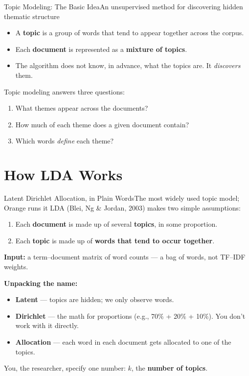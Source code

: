 \documentclass[aspectratio=169,10pt]{beamer}
\begin{document}
\begin{frame}{Topic Modeling: The Basic Idea}{An unsupervised method for discovering hidden thematic structure}
  \begin{itemize}
    \item A \textbf{topic} is a group of words that tend to appear together across the corpus.
    \item Each \textbf{document} is represented as a \textbf{mixture of topics}.
    \item The algorithm does not know, in advance, what the topics are. It \emph{discovers} them.
  \end{itemize}

  \vspace{0.6em}
  Topic modeling answers three questions:
  \begin{enumerate}
    \item What themes appear across the documents?
    \item How much of each theme does a given document contain?
    \item Which words \emph{define} each theme?
  \end{enumerate}
\end{frame}

\section{How LDA Works}

\begin{frame}{Latent Dirichlet Allocation, in Plain Words}{The most widely used topic model; Orange runs it}
  LDA (Blei, Ng \& Jordan, 2003) makes two simple assumptions:
  \begin{enumerate}
    \item Each \textbf{document} is made up of several \textbf{topics}, in some proportion.
    \item Each \textbf{topic} is made up of \textbf{words that tend to occur together}.
  \end{enumerate}

  \vspace{0.4em}
  \textbf{Input:} a term--document matrix of word counts --- a bag of words, not TF--IDF weights.

  \vspace{0.4em}
  \textbf{Unpacking the name:}
  \begin{itemize}
    \item \textbf{Latent} --- topics are hidden; we only observe words.
    \item \textbf{Dirichlet} --- the math for proportions (e.g., 70\% + 20\% + 10\%). You don't work with it directly.
    \item \textbf{Allocation} --- each word in each document gets allocated to one of the topics.
  \end{itemize}

  \vspace{0.3em}
  You, the researcher, specify one number: $k$, the \textbf{number of topics}.
\end{frame}
\end{document}
